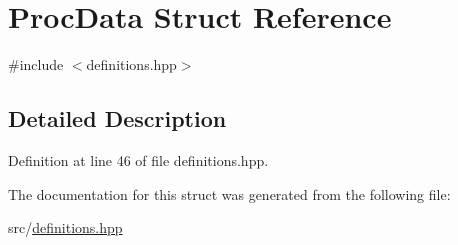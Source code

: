 \hypertarget{structProcData}{\section{Proc\+Data Struct Reference}
\label{structProcData}
}


{\ttfamily \#include $<$definitions.\+hpp$>$}



\subsection{Detailed Description}


Definition at line 46 of file definitions.\+hpp.



The documentation for this struct was generated from the following file\+:\begin{DoxyCompactItemize}
\item 
src/\hyperlink{definitions_8hpp}{definitions.\+hpp}\end{DoxyCompactItemize}
